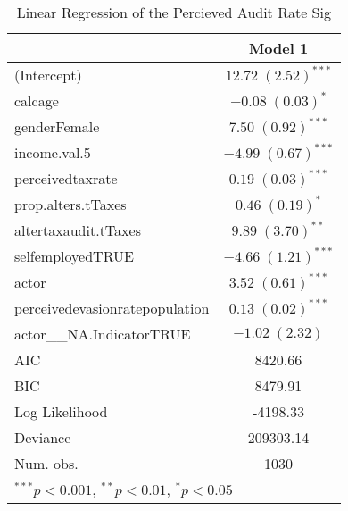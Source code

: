 
\begin{table}
\begin{tabular}{l c }
\hline
 & Model 1 \\
\hline
(Intercept)                    & $12.72 \; (2.52)^{***}$ \\
calcage                        & $-0.08 \; (0.03)^{*}$   \\
genderFemale                   & $7.50 \; (0.92)^{***}$  \\
income.val.5                   & $-4.99 \; (0.67)^{***}$ \\
perceivedtaxrate               & $0.19 \; (0.03)^{***}$  \\
prop.alters.tTaxes             & $0.46 \; (0.19)^{*}$    \\
altertaxaudit.tTaxes           & $9.89 \; (3.70)^{**}$   \\
selfemployedTRUE               & $-4.66 \; (1.21)^{***}$ \\
actor                          & $3.52 \; (0.61)^{***}$  \\
perceivedevasionratepopulation & $0.13 \; (0.02)^{***}$  \\
actor\_\_NA.IndicatorTRUE      & $-1.02 \; (2.32)$       \\
\hline
AIC                            & 8420.66                 \\
BIC                            & 8479.91                 \\
Log Likelihood                 & -4198.33                \\
Deviance                       & 209303.14               \\
Num. obs.                      & 1030                    \\
\hline
\multicolumn{2}{l}{\scriptsize{$^{***}p<0.001$, $^{**}p<0.01$, $^*p<0.05$}}
\end{tabular}
\caption{Linear Regression of the Percieved Audit Rate Sig}
\label{table:coefficients}
\end{table}
